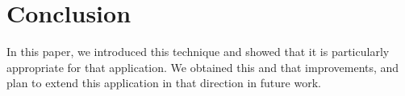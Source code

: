 \section{Conclusion}
%
In this paper, we introduced this technique and showed that it is particularly appropriate for that application. We obtained this and that improvements, and plan to extend this application in that direction in future work.